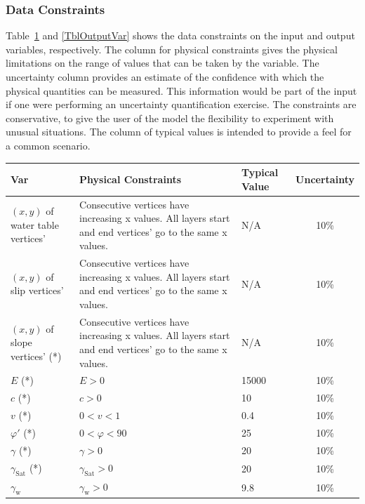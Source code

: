 \documentclass[12pt]{article}
\renewcommand{\arraystretch}{1}
\begin{document}

\subsubsection{Data Constraints} \label{sec_DataConstraints}    

Table~\ref{TblInputVar} and \ref{TblOutputVar} shows the data constraints on the input and output variables, respectively. The column for physical constraints gives the physical limitations on the range of values that can be taken by the variable. The uncertainty column provides an estimate of the confidence with which the physical quantities can be measured. This information would be part of the input if one were performing an uncertainty quantification exercise. The constraints are conservative, to give the user of the model the flexibility to experiment with unusual situations. The column of typical values is intended to provide a feel for a common scenario.

\newpage

\renewcommand{\arraystretch}{1.5}
\noindent \begin{longtable}{p{2.4cm} p{5.8cm} p{1.2cm} c}
  \toprule  \label{TblInputVar}
  \textbf{Var} & \textbf{Physical Constraints} & \textbf{Typical
    Value} & \textbf{Uncertainty}\\ \midrule
  $(x,y)$ of water table vertices' & Consecutive vertices have
  increasing x values. All layers start and end vertices' go to the
  same x values. & N/A & 10\% \\
  $(x,y)$ of slip vertices' & Consecutive vertices have increasing x
  values. All layers start and end vertices' go to the same x
  values. & N/A & 10\% \\
  $(x,y)$ of slope vertices' (*) & Consecutive vertices have
  increasing x values. All layers start and end vertices' go to the
  same x values. & N/A & 10\% \\
  $E$ (*) & $E > 0$ & 15000 & 10\%\\
  $c$ (*) & $c >0$ & 10 & 10\%\\
  $v$ (*) & $ 0 < v < 1 $ & 0.4 & 10\%\\
  $\varphi'$ (*) & $ 0 < \varphi < 90 $ & 25 & 10\% \\
  $\gamma$ (*) & $\gamma > 0$ & 20 & 10\% \\
  $\gamma_{\text{Sat}}$ (*) & $\gamma_{\text{Sat}} > 0 $ & 20 & 10\%
  \\
  $\gamma_{\text{w}}$ & $\gamma_{\text{w}} > 0 $ & 9.8 & 10\% \\
  \bottomrule
\end{longtable}
\end{document}
